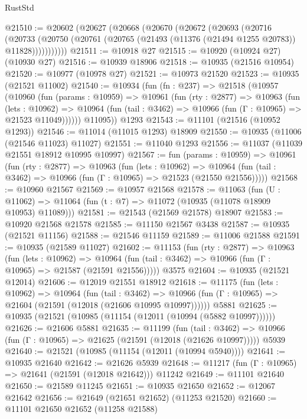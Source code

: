 \begin{lexlean}{RustStd}
\begin{coremodule}
{{{{{{{{{{{{{{{{{{{@21510 := @20602
    (@20627
      (@20668
        (@20670
          (@20672
            (@20693
              (@20716
                (@20733
                  (@20750 (@20761 (@20765 (@21493 (@11376 (@21494 @1255 @20783)) @11828)))))))))))
@21511 := @10918 @27
@21515 := @10920 (@10924 @27) (@10930 @27)
@21516 := @10939 @18906
@21518 := @10935 (@21516 @10954)
@21520 := @10977 (@10978 @27)
@21521 := @10973 @21520
@21523 := @10935 (@21521 @11002)
@21540 := @10934
    (fun (fn : @237) =>
    @21518
      (@10957
        (@10960
          (fun (params : @10959) =>
          @10961
            (fun (rty : @2877) =>
            @10963
              (fun (lets : @10962) =>
              @10964 (fun (tail : @3462) => @10966 (fun (Γ : @10965) => @21523 @11049))))))
        @11095))
    @1293
@21543 := @11101 (@21516 (@10952 @1293))
@21546 := @11014 (@11015 @1293) @18909
@21550 := @10935 (@11006 (@21546 @11023) @11027)
@21551 := @11040 @1293
@21556 := @11037 (@11039 @21551 @18912 @10995 @10997)
@21567 := fun (params : @10959) =>
  @10961
    (fun (rty : @2877) =>
    @10963
      (fun (lets : @10962) =>
      @10964 (fun (tail : @3462) => @10966 (fun (Γ : @10965) => @21523 (@21550 @21556)))))
@21568 := @10960 @21567
@21569 := @10957 @21568
@21578 := @11063
    (fun (U : @11062) => @11064 (fun (t : @7) => @11072 (@10935 (@11078 @18909 @10953) @11089)))
@21581 := @21543 (@21569 @21578) @18907
@21583 := @10920 @21568 @21578
@21585 := @11150 @21567 @3438
@21587 := @10935 (@21521 @11156)
@21588 := @21546 @11159
@21589 := @11006 @21588
@21591 := @10935 (@21589 @11027)
@21602 := @11153
    (fun (rty : @2877) =>
    @10963
      (fun (lets : @10962) =>
      @10964 (fun (tail : @3462) => @10966 (fun (Γ : @10965) => @21587 (@21591 @21556)))))
    @3575
@21604 := @10935 (@21521 @12014)
@21606 := @12019 @21551 @18912
@21618 := @11175
    (fun (lets : @10962) =>
    @10964
      (fun (tail : @3462) =>
      @10966 (fun (Γ : @10965) => @21604 (@21591 (@12018 (@21606 @10995 @10997))))))
    @5881
@21625 := @10935 (@21521 (@10985 (@11154 (@12011 (@10994 (@5882 @10997))))))
@21626 := @21606 @5881
@21635 := @11199
    (fun (tail : @3462) => @10966 (fun (Γ : @10965) => @21625 (@21591 (@12018 (@21626 @10997)))))
    @5939
@21640 := @21521 (@10985 (@11154 (@12011 (@10994 @5940))))
@21641 := @10935 @21640
@21642 := @21626 @5939
@21648 := @11217 (fun (Γ : @10965) => @21641 (@21591 (@12018 @21642))) @11242
@21649 := @11101 @21640
@21650 := @21589 @11245
@21651 := @10935 @21650
@21652 := @12067 @21642
@21656 := @21649 (@21651 @21652) (@11253 @21520)
@21660 := @11101 @21650 @21652 (@11258 @21588)
}}}}}}}}}}}}}}}}}}}
\end{coremodule}
\end{lexlean}
